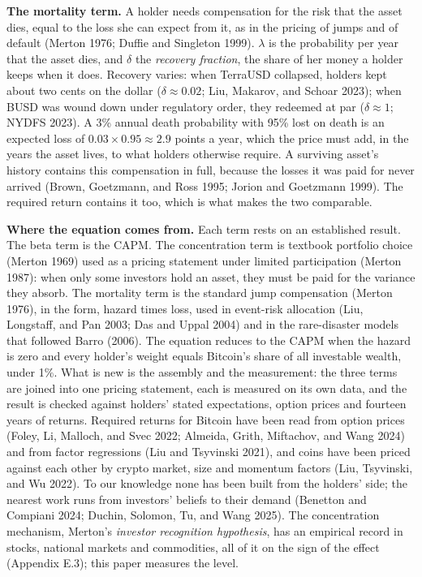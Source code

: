 \documentclass[11pt]{article}
\begin{document}
\textbf{The mortality term.} A holder needs compensation for the risk that the asset dies, equal to the loss she can expect from it, as in the pricing of jumps and of default (Merton 1976; Duffie and Singleton 1999). $\lambda$ is the probability per year that the asset dies, and $\delta$ the \emph{recovery fraction}, the share of her money a holder keeps when it does. Recovery varies: when TerraUSD collapsed, holders kept about two cents on the dollar ($\delta \approx 0.02$; Liu, Makarov, and Schoar 2023); when BUSD was wound down under regulatory order, they redeemed at par ($\delta \approx 1$; NYDFS 2023). A 3\% annual death probability with 95\% lost on death is an expected loss of $0.03 \times 0.95 \approx 2.9$ points a year, which the price must add, in the years the asset lives, to what holders otherwise require. A surviving asset's history contains this compensation in full, because the losses it was paid for never arrived (Brown, Goetzmann, and Ross 1995; Jorion and Goetzmann 1999). The required return contains it too, which is what makes the two comparable.

\textbf{Where the equation comes from.} Each term rests on an established result. The beta term is the CAPM. The concentration term is textbook portfolio choice (Merton 1969) used as a pricing statement under limited participation (Merton 1987): when only some investors hold an asset, they must be paid for the variance they absorb. The mortality term is the standard jump compensation (Merton 1976), in the form, hazard times loss, used in event-risk allocation (Liu, Longstaff, and Pan 2003; Das and Uppal 2004) and in the rare-disaster models that followed Barro (2006). The equation reduces to the CAPM when the hazard is zero and every holder's weight equals Bitcoin's share of all investable wealth, under 1\%. What is new is the assembly and the measurement: the three terms are joined into one pricing statement, each is measured on its own data, and the result is checked against holders' stated expectations, option prices and fourteen years of returns. Required returns for Bitcoin have been read from option prices (Foley, Li, Malloch, and Svec 2022; Almeida, Grith, Miftachov, and Wang 2024) and from factor regressions (Liu and Tsyvinski 2021), and coins have been priced against each other by crypto market, size and momentum factors (Liu, Tsyvinski, and Wu 2022). To our knowledge none has been built from the holders' side; the nearest work runs from investors' beliefs to their demand (Benetton and Compiani 2024; Duchin, Solomon, Tu, and Wang 2025). The concentration mechanism, Merton's \emph{investor recognition hypothesis}, has an empirical record in stocks, national markets and commodities, all of it on the sign of the effect (Appendix E.3); this paper measures the level.
\end{document}

